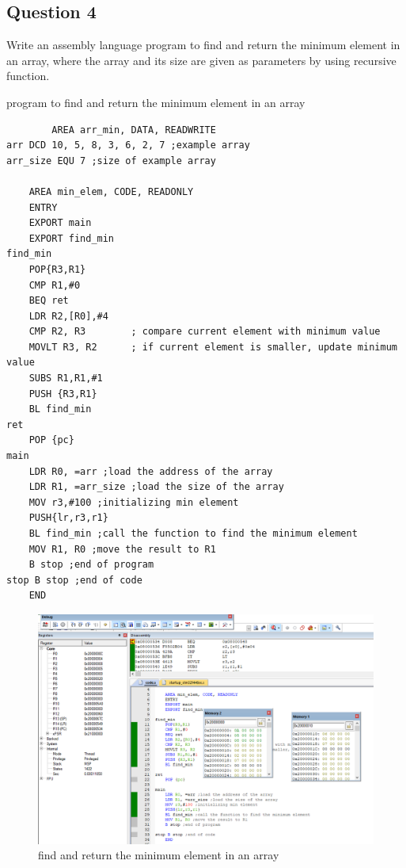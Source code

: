 \documentclass[11pt]{article}
\begin{document}
\subsection{Question 4}
Write an assembly language program to find and return the minimum element in an array, where the array and its size are given as parameters by using recursive function.
\begin{listing}[h]
    \caption {program to find and return the minimum element in an array}
    \begin{verbatim}
		AREA arr_min, DATA, READWRITE
arr DCD 10, 5, 8, 3, 6, 2, 7 ;example array
arr_size EQU 7 ;size of example array
	
	AREA min_elem, CODE, READONLY
	ENTRY
	EXPORT main
	EXPORT find_min
find_min
	POP{R3,R1}
	CMP R1,#0
	BEQ ret
	LDR R2,[R0],#4
	CMP R2, R3        ; compare current element with minimum value
    MOVLT R3, R2      ; if current element is smaller, update minimum value
	SUBS R1,R1,#1
	PUSH {R3,R1}
	BL find_min
ret   
	POP {pc}
main
    LDR R0, =arr ;load the address of the array
    LDR R1, =arr_size ;load the size of the array
	MOV r3,#100 ;initializing min element
	PUSH{lr,r3,r1}
    BL find_min ;call the function to find the minimum element
    MOV R1, R0 ;move the result to R1
    B stop ;end of program
stop B stop ;end of code
	END
\end{verbatim}
\end{listing}
\clearpage
\begin{figure}[!h]
    \centering
    \includegraphics[width=\textwidth]{prob4.PNG}
    \caption{find and return the minimum element in an array}
\end{figure} 
\clearpage
\end{document}
